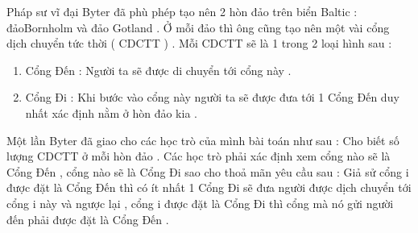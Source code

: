 Pháp sư vĩ đại Byter đã phù phép tạo nên 2 hòn đảo trên biển Baltic : đảoBornholm và đảo Gotland . Ở mỗi đảo thì ông cũng tạo nên một vài cổng dịch chuyển tức thời ( CDCTT ) . Mỗi CDCTT sẽ là 1 trong 2 loại hình sau :
\begin{enumerate}
	\item Cổng Đến : Người ta sẽ được di chuyển tới cổng này .
	\item Cổng Đi : Khi bước vào cổng này người ta sẽ được đưa tới 1 Cổng Đến duy nhất xác định nằm ở hòn đảo kia .
\end{enumerate}




Một lần Byter đã giao cho các học trò của mình bài toán như sau : Cho biết số lượng CDCTT ở mỗi hòn đảo . Các học trò phải xác định xem cổng nào sẽ là Cổng Đến , cổng nào sẽ là Cổng Đi sao cho thoả mãn yêu cầu sau : Giả sử cổng i được đặt là Cổng Đến thì có ít nhất 1 Cổng Đi sẽ đưa người được dịch chuyển tới cổng i này và ngược lại , cổng i được đặt là Cổng Đi thì cổng mà nó gửi người đến phải được đặt là Cổng Đến .